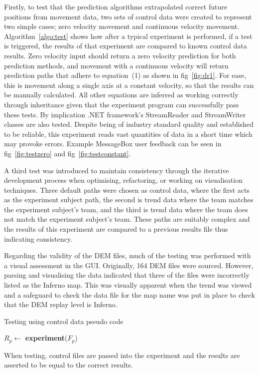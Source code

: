 \documentclass[journal]{IEEEtran}
\begin{document}
Firstly, to test that the prediction algorithms extrapolated correct future positions from movement data, two sets of control data were created to represent two simple cases; zero velocity movement and continuous velocity movement. Algorithm~\ref{algo:test} shows how after a typical experiment is performed, if a test is triggered, the results of that experiment are compared to known control data results. Zero velocity input should return a zero velocity prediction for both prediction methods, and movement with a continuous velocity will return prediction paths that adhere to equation~(1) as shown in fig~\ref{fig:dr1}. For ease, this is movement along a single axis at a constant velocity, so that the results can be manually calculated. All other equations are inferred as working correctly through inheritance given that the experiment program can successfully pass these tests. By implication .NET framework's StreamReader and StreamWriter classes are also tested. Despite being of industry standard quality and established to be reliable, this experiment reads vast quantities of data in a short time which may provoke errors. Example MessageBox user feedback can be seen in fig~\ref{fig:testzero} and fig~\ref{fig:testconstant}.

A third test was introduced to maintain consistency through the iterative development process when optimising, refactoring, or working on visualisation techniques. Three default paths were chosen as control data, where the first acts as the experiment subject path, the second is trend data where the team matches the experiment subject's team, and the third is trend data where the team does not match the experiment subject's team. These paths are suitably complex and the results of this experiment are compared to a previous results file thus indicating consistency.

Regarding the validity of the DEM files, much of the testing was performed with a visual assessment in the GUI. Originally, 164 DEM files were sourced. However, parsing and visualising the data indicated that three of the files were incorrectly listed as the Inferno map. This was visually apparent when the trend was viewed and a safeguard to check the data file for the map name was put in place to check that the DEM replay level is Inferno.

\hrulefill

{\sc Testing using control data pseudo code}

\hrulefill

\begin{algorithm}
\DontPrintSemicolon %
$R_p \gets$ \textbf{experiment}($F_p$) \\
\caption{When testing, control files are passed into the experiment and the results are asserted to be equal to the correct results.}
\label{algo:test}
\end{algorithm}
\end{document}

